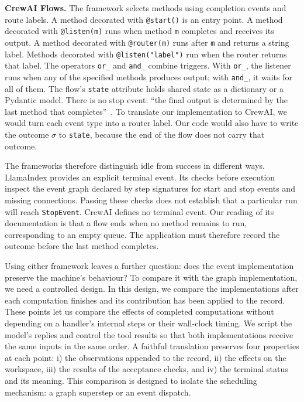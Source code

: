 \item \textbf{CrewAI Flows.} The framework selects methods using completion events and route
labels. A method decorated with \texttt{@start()} is an entry point. A method decorated with \texttt{@listen(m)} runs when
method \texttt{m} completes and receives its output. A method decorated with \texttt{@router(m)}
runs after \texttt{m} and returns a string label. Methods decorated with \texttt{@listen("label")}
run when the router returns that label. The operators \texttt{or\_} and \texttt{and\_} combine
triggers. With \texttt{or\_}, the listener runs when any of the specified methods produces output;
with \texttt{and\_}, it waits for all of them. The flow's \texttt{state} attribute holds shared
state as a dictionary or a Pydantic model. There is
no stop event: ``the final output is determined by the last method that completes''~\citep{crewai-flows}.
To translate our implementation to CrewAI, we would turn each event type into a router label.
Our code would also have to write the outcome $\sigma$ to \texttt{state}, because the end of the
flow does not carry that outcome.

\ei

The frameworks therefore distinguish idle from success in different ways. LlamaIndex provides an
explicit terminal event. Its checks before execution inspect the event graph declared by step
signatures for start and stop events and missing connections. Passing these checks does not
establish that a particular run will reach \texttt{StopEvent}. CrewAI defines no terminal event.
Our reading of its documentation is that a flow ends when no method remains to run, corresponding
to an empty queue. The application must therefore record the outcome before the last method
completes.

Using either framework leaves a further question: does the event implementation preserve the
machine's behaviour? To compare it with the graph implementation, we need a controlled design.
In this design, we compare the implementations after each computation finishes and its
contribution has been applied to the record. These points let us compare the effects of completed
computations without depending on a handler's internal steps or their wall-clock timing. We
script the model's replies and control the tool results so that both implementations receive the
same inputs in the same order. A faithful translation preserves four properties at each point:
i) the observations appended to the record, ii) the effects on the workspace, iii) the results of
the acceptance checks, and iv) the terminal status and its meaning. This comparison is designed
to isolate the scheduling mechanism: a graph superstep or an event dispatch.

